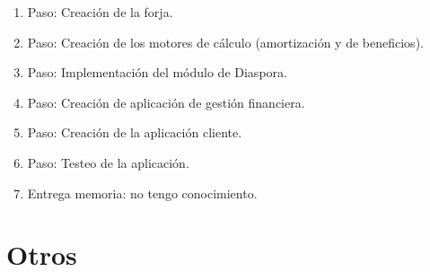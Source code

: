 \documentclass[10pt]{article}
\begin{document}
\begin{enumerate}
  \item Paso: Creación de la forja.
  \item Paso: Creación de los motores de cálculo (amortización y de beneficios).
  \item Paso: Implementación del módulo de Diaspora.
  \item Paso: Creación de aplicación de gestión financiera. 
  \item Paso: Creación de la aplicación cliente.
  \item Paso: Testeo de la aplicación.
  \item Entrega memoria: no tengo conocimiento.
\end{enumerate}

\section{Otros}

\end{document}
